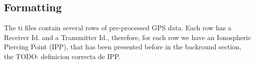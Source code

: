 
\subsection{Formatting}

The ti files contain several rows of pre-processed GPS data. Each row has a Receiver Id. and a Transmitter Id., therefore, for each row we have an Ionospheric Piercing Point (IPP), that has been presented before in the backround section, the TODO: definicion correcta de IPP.

